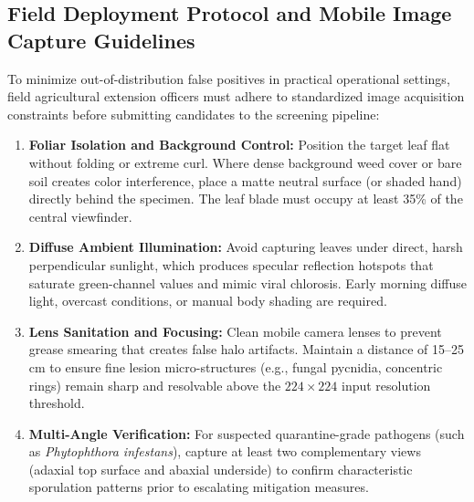 \documentclass[pdflatex,sn-mathphys-num]{sn-jnl}
\theoremstyle{thmstyleone}%
\theoremstyle{thmstyletwo}%
\theoremstyle{thmstylethree}%
\begin{document}
\begin{appendices}
\subsection{Field Deployment Protocol and Mobile Image Capture Guidelines}
To minimize out-of-distribution false positives in practical operational settings, field agricultural extension officers must adhere to standardized image acquisition constraints before submitting candidates to the screening pipeline:
\begin{enumerate}
  \item \textbf{Foliar Isolation and Background Control:} Position the target leaf flat without folding or extreme curl. Where dense background weed cover or bare soil creates color interference, place a matte neutral surface (or shaded hand) directly behind the specimen. The leaf blade must occupy at least 35\% of the central viewfinder.
  \item \textbf{Diffuse Ambient Illumination:} Avoid capturing leaves under direct, harsh perpendicular sunlight, which produces specular reflection hotspots that saturate green-channel values and mimic viral chlorosis. Early morning diffuse light, overcast conditions, or manual body shading are required.
  \item \textbf{Lens Sanitation and Focusing:} Clean mobile camera lenses to prevent grease smearing that creates false halo artifacts. Maintain a distance of 15--25\,cm to ensure fine lesion micro-structures (e.g., fungal pycnidia, concentric rings) remain sharp and resolvable above the $224 \times 224$ input resolution threshold.
  \item \textbf{Multi-Angle Verification:} For suspected quarantine-grade pathogens (such as \textit{Phytophthora infestans}), capture at least two complementary views (adaxial top surface and abaxial underside) to confirm characteristic sporulation patterns prior to escalating mitigation measures.
\end{enumerate}

\end{appendices}



\end{document}
